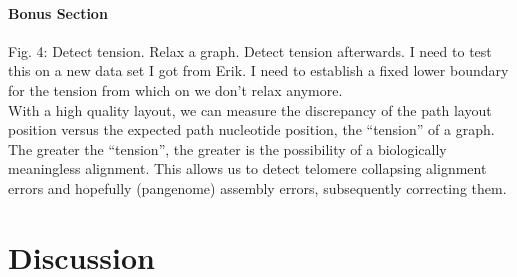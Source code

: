 \documentclass{bioinfo}
\theoremstyle{definition}
\begin{document}
    \paragraph{Bonus Section}
    Fig. 4: Detect tension. Relax a graph. Detect tension afterwards.
    I need to test this on a new data set I got from Erik.
    I need to establish a fixed lower boundary for the tension from which on we don't relax anymore. \\
    With a high quality layout, we can measure the discrepancy of the path layout position versus the expected path nucleotide position, the “tension” of a graph.
    The greater the “tension”, the greater is the possibility of a biologically meaningless alignment.
    This allows us to detect telomere collapsing alignment errors and hopefully (pangenome) assembly errors, subsequently correcting them.
    
    \fi


    \section{Discussion}
    \label{sec:discussion}
\end{document}
